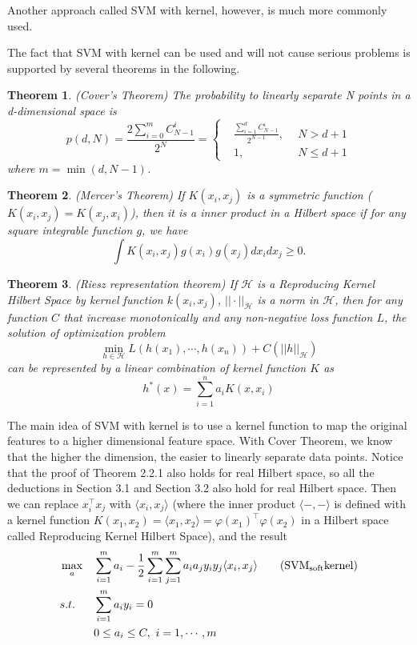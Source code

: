 \documentclass[a4paper]{report}
\newtheorem{theorem}{Theorem}[section]
\begin{document}
Another approach called SVM with kernel, however, is much more commonly used.

The fact that SVM with kernel can be used and will not cause serious problems is supported by several theorems in the following.

\begin{theorem}
    (Cover's Theorem\cite{cover1965geometrical}) The probability to linearly separate N points in a d-dimensional space is
    \[
        p(d,N)=\frac{2\sum_{i=0}^mC_{N-1}^i}{2^N}=\left\{ 
        \begin{aligned}
            &\frac{\sum_{i=1}^dC^i_{N-1}}{2^{N-1}},\ \ &N>d+1 \\ &1,\ \ &N\le d+1
        \end{aligned} \right.
    \]
    where $m=\min(d,N-1)$.
\end{theorem}

\begin{theorem}
    (Mercer's Theorem\cite{mercer1909functions}) If $K(x_i,x_j)$ is a symmetric function ($K(x_i,x_j)=K(x_j,x_i)$), then it is a inner product in a Hilbert space if for any square integrable function $g$, we have
    \[
        \int K(x_i,x_j)g(x_i)g(x_j)dx_idx_j \geq 0.
    \]
\end{theorem}

\begin{theorem}
    (Riesz representation theorem\cite{riesz1907espèce}) If $\mathcal H$ is a Reproducing Kernel Hilbert Space by kernel function $k(x_i,x_j)$, $||\cdot||_{\mathcal H}$ is a norm in $\mathcal H$, then for any function $C$ that increase monotonically and any non-negative loss function $L$, the solution of optimization problem
    \[
        \min_{h\in\mathcal H} L(h(x_1),\cdots,h(x_n))+C(||h||_{\mathcal H})
    \]
    can be represented by a linear combination of kernel function $K$ as
    \[
        h^*(x)=\sum_{i=1}^n a_i K(x,x_i)
    \]
\end{theorem}


The main idea of SVM with kernel is to use a kernel function to map the original features to a higher dimensional feature space. With Cover Theorem, we know that the higher the dimension, the easier to linearly separate data points. Notice that the proof of Theorem 2.2.1 also holds for real Hilbert space, so all the deductions in Section 3.1 and Section 3.2 also hold for real Hilbert space. Then we can replace $x_i^\top x_j$ with $\langle x_i,x_j \rangle$ (where the inner product $\langle -,-
    \rangle$ is defined with a kernel function $K(x_1,x_2)=\langle x_1,x_2\rangle=\varphi(x_1)^\top \varphi(x_2)$ in a Hilbert space called Reproducing Kernel Hilbert Space), and the result 
\begin{align*}
    &\max_a & & \sum_{i=1}^m a_i - \frac{1}{2} \sum_{i=1}^m\sum_{j=1}^m a_i a_j y_i y_j \langle x_i, x_j\rangle \label{softsvmk}\tag{$\mathrm{SVM_{soft} kernel}$}\\
    &s.t. \ & & \sum_{i=1}^m a_i y_i=0 \\
    & & & 0\leq a_i \leq C,\ i=1,\cdots,m 
\end{align*}
\end{document}
